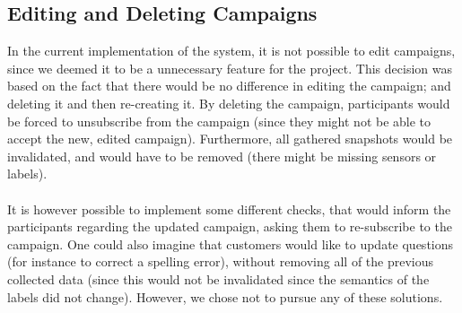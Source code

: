 \subsection{Editing and Deleting Campaigns}

In the current implementation of the system, it is not possible to edit campaigns, since we deemed it to be a unnecessary feature for the project. This decision was based on the fact that there would be no difference in editing the campaign; and deleting it and then re-creating it. By deleting the campaign, participants would be forced to unsubscribe from the campaign (since they might not be able to accept the new, edited campaign). Furthermore, all gathered snapshots would be invalidated, and would have to be removed (there might be missing sensors or labels).
\\\\
It is however possible to implement some different checks, that would inform the participants regarding the updated campaign, asking them to re-subscribe to the campaign. One could also imagine that customers would like to update questions (for instance to correct a spelling error), without removing all of the previous collected data (since this would not be invalidated since the semantics of the labels did not change). However, we chose not to pursue any of these solutions.

